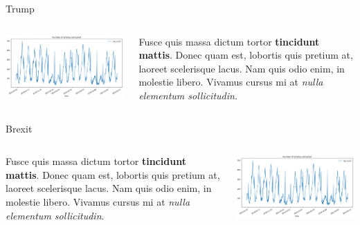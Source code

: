 \documentclass[final,8pt]{beamer} %
\newlength{\twocolwid}
\begin{document}
\begin{frame}[t]
\begin{columns}[t]
\begin{column}{\twocolwid}
\begin{block}{Trump}

\begin{columns}[onlytextwidth]
    \begin{column}{.45\textwidth}
        \includegraphics[width=0.8\linewidth]{log_extraction.png} 
    \end{column}
    \begin{column}{.55\textwidth}
        Fusce quis massa dictum tortor \textbf{tincidunt mattis}. Donec quam est, lobortis quis pretium at, laoreet scelerisque lacus. Nam quis odio enim, in molestie libero. Vivamus cursus mi at \textit{nulla elementum sollicitudin}.
    \end{column}
\end{columns}

\end{block}


\begin{block}{Brexit}


    \begin{columns}[onlytextwidth]
        \begin{column}{.55\textwidth}
            Fusce quis massa dictum tortor \textbf{tincidunt mattis}. Donec quam est, lobortis quis pretium at, laoreet scelerisque lacus. Nam quis odio enim, in molestie libero. Vivamus cursus mi at \textit{nulla elementum sollicitudin}.
        \end{column}
        \begin{column}{.45\textwidth}
            \includegraphics[width=0.8\linewidth]{log_extraction.png} 
        \end{column}
    \end{columns}


\end{block}
\end{column}
\end{columns}
\end{frame}
\end{document}
